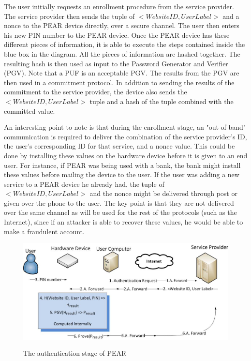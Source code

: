 The user initially requests an enrollment procedure from the service provider. The service provider then sends the tuple
of $<Website ID, User Label>$ and a nonce to the PEAR device directly, over a secure channel. The user then enters his
new PIN number to the PEAR device. Once the PEAR device has these different pieces of information, it is able to execute
the steps contained inside the blue box in the diagram. All the pieces of information are hashed together. The resulting
hash is then used as input to the Password Generator and Verifier (PGV). Note that a PUF is an acceptable PGV. The results
from the PGV are then used in a commitment protocol. In addition to sending the results of the commitment to the service
provider, the device also sends the $<Website ID, User Label>$ tuple and a hash of the tuple combined with the committed value.

An interesting point to note is that during the enrollment stage, an "out of band" communication is required to deliver
the combination of the service provider's ID, the user's corresponding ID for that service, and a nonce value. This could
be done by installing these values on the hardware device before it is given to an end user. For instance, if PEAR was being
used with a bank, the bank might install these values before mailing the device to the user. If the user was adding a new
service to a PEAR device he already had, the tuple of $<Website ID, User Label>$ and the nonce might be delivered through
post or given over the phone to the user. The key point is that they are not delivered over the same channel as will be
used for the rest of the protocols (such as the Internet), since if an attacker is able to recover these values, he would
be able to make a fraudulent account.

\begin{figure}[!ht]
\includegraphics[width=500px]{images/auth.jpg}
\label{fig:pearauthentication}
\caption{The authentication stage of PEAR}
\end{figure}
\FloatBarrier

